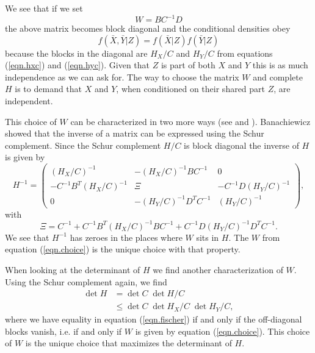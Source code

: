 \documentclass[11pt, a4paper]{article}
\begin{document}
We see that if we set
\begin{equation}\label{eqn.choice}
	W = BC^{-1}D
\end{equation}
the above matrix becomes block diagonal and the conditional densities obey
\begin{equation}\label{eqn.independent}
	f(\bar X,\bar Y\vert Z ) = f(\bar X\vert Z)f(\bar Y\vert Z)
\end{equation}
because the blocks in the diagonal are $H_X/C$ and $H_Y/C$ from equations (\ref{eqn.hxc}) and (\ref{eqn.hyc}). Given that $Z$ is part of both $X$ and $Y$ this is as much independence as we can ask for. The way to choose the matrix $W$ and complete $H$ is to demand that $X$ and $Y$, when conditioned on their shared part $Z$, are independent.

This choice of $W$ can be characterized in two more ways (see \cite{smith} and \cite{ksd}). Banachiewicz showed that the inverse of a matrix can be expressed using the Schur complement. Since the Schur complement $H/C$ is block diagonal the inverse of $H$ is given by
\begin{equation}
	H^{-1} = \begin{pmatrix}
		(H_X/C)^{-1} & -(H_X/C)^{-1} B C^{-1} & 0 \\
		- C^{-1} B^T (H_X/C)^{-1} & \Xi & - C^{-1} D (H_Y/C)^{-1} \\
		0 & - (H_Y/C)^{-1} D^T C^{-1} & (H_Y/C)^{-1} 
	\end{pmatrix},
\end{equation}
with
\begin{equation}
\Xi = C^{-1} + C^{-1} B^T (H_X/C)^{-1} B C^{-1} + C^{-1} D (H_Y/C)^{-1} D^T C^{-1}.
\end{equation}
We see that $H^{-1}$ has zeroes in the places where $W$ sits in $H$. The $W$ from equation (\ref{eqn.choice}) is the unique choice with that property.  

When looking at the determinant of $H$ we find another characterization of $W$. Using the Schur complement again, we find
\begin{align}
	\det H & = \det C \; \det H/C \\
	& \le \det C \; \det H_X/C \; \det H_Y/C,\label{eqn.fischer}
\end{align}
where we have equality in equation (\ref{eqn.fischer}) if and only if the off-diagonal blocks vanish, i.e. if and only if $W$ is given by equation (\ref{eqn.choice}). This choice of $W$ is the unique choice that maximizes the determinant of $H$.
\end{document}
